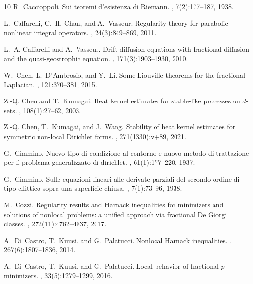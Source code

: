 \documentclass[11pt]{amsart}
\theoremstyle{plain}
\theoremstyle{definition}
\numberwithin{equation}{section}
\begin{document}
\begin{thebibliography}{10}
R.~Caccioppoli.
\newblock Sui teoremi d'esistenza di {R}iemann.
, 7(2):177--187,
  1938.

L.~Caffarelli, C.~H. Chan, and A.~Vasseur.
\newblock Regularity theory for parabolic nonlinear integral operators.
, 24(3):849--869, 2011.

L.~A. Caffarelli and A.~Vasseur.
\newblock Drift diffusion equations with fractional diffusion and the
  quasi-geostrophic equation.
, 171(3):1903--1930, 2010.

W.~Chen, L.~D'Ambrosio, and Y.~Li.
\newblock Some {L}iouville theorems for the fractional {L}aplacian.
, 121:370--381, 2015.

Z.-Q. Chen and T.~Kumagai.
\newblock Heat kernel estimates for stable-like processes on {$d$}-sets.
, 108(1):27--62, 2003.

Z.-Q. Chen, T.~Kumagai, and J.~Wang.
\newblock Stability of heat kernel estimates for symmetric non-local
  {D}irichlet forms.
, 271(1330):v+89, 2021.

G.~Cimmino.
\newblock Nuovo tipo di condizione al contorno e nuovo metodo di trattazione
  per il problema generalizzato di dirichlet.
,
  61(1):177--220, 1937.

G.~Cimmino.
\newblock Sulle equazioni lineari alle derivate parziali del secondo ordine di
  tipo ellittico sopra una superficie chiusa.
, 7(1):73--96, 1938.

M.~Cozzi.
\newblock Regularity results and {H}arnack inequalities for minimizers and
  solutions of nonlocal problems: a unified approach via fractional {D}e
  {G}iorgi classes.
, 272(11):4762--4837, 2017.

A.~Di~Castro, T.~Kuusi, and G.~Palatucci.
\newblock Nonlocal {H}arnack inequalities.
, 267(6):1807--1836, 2014.

A.~Di~Castro, T.~Kuusi, and G.~Palatucci.
\newblock Local behavior of fractional {$p$}-minimizers.
,
  33(5):1279--1299, 2016.


\end{thebibliography}
\end{document}

